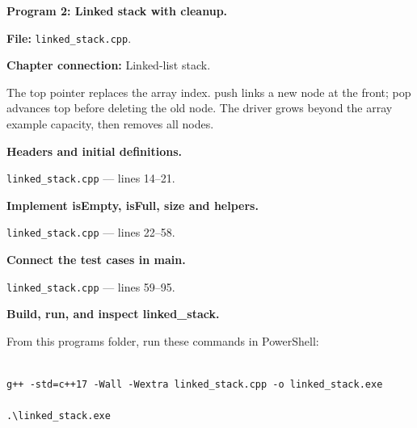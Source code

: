 \textbf{Program 2: Linked stack with cleanup.}

\textbf{File:} \texttt{linked\_stack.cpp}.

\textbf{Chapter connection:} Linked-list stack.

The top pointer replaces the array index. push links a new node at the front; pop advances top before deleting the old node. The driver grows beyond the array example capacity, then removes all nodes.



\begin{utpsteps}\setcounter{enumi}{0}\item \textbf{Headers and initial definitions.}\end{utpsteps}

\texttt{linked\_stack.cpp} --- lines 14--21.




\tcbbreak

\begin{utpsteps}\setcounter{enumi}{1}\item \textbf{Implement isEmpty, isFull, size and helpers.}\end{utpsteps}

\texttt{linked\_stack.cpp} --- lines 22--58.






\tcbbreak

\begin{utpsteps}\setcounter{enumi}{2}\item \textbf{Connect the test cases in main.}\end{utpsteps}

\texttt{linked\_stack.cpp} --- lines 59--95.




\tcbbreak

\textbf{Build, run, and inspect linked\_stack.}

From this program\textquotesingle s folder, run these commands in PowerShell:

\begin{lstlisting}[style=utpterminal,language={}]

g++ -std=c++17 -Wall -Wextra linked_stack.cpp -o linked_stack.exe

.\linked_stack.exe

\end{lstlisting}

